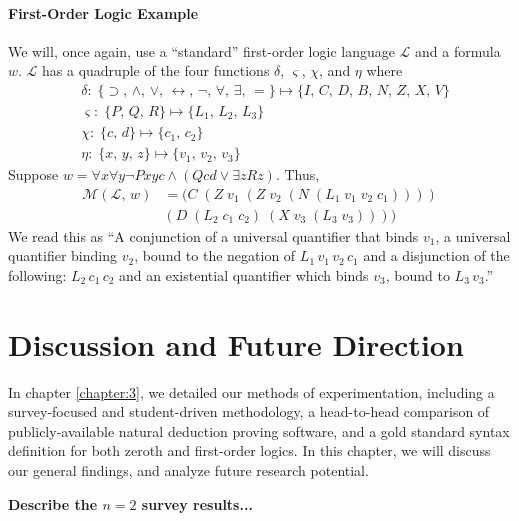 \documentclass[ms]{uncgdissertationexp2}
\theoremstyle{plain}
\theoremstyle{definition}
\theoremstyle{remark}
\begin{document}
\subsubsection{First-Order Logic Example} We will, once again, use a ``standard'' first-order logic language $\mathcal{L}$ and a formula $w$. $\mathcal{L}$ has a quadruple of the four functions $\delta$, $\varsigma$, $\chi$, and $\eta$ where
\begin{align*}
	  & \delta:\;\{\supset,\,\land,\,\lor,\,\leftrightarrow,\,\lnot,\,\forall,\,\exists,\,=\}\mapsto \{I,\,C,\,D,\,B,\,N,\,Z,\,X,\,V\} \\
	  & \varsigma:\;\{P,\,Q,\,R\} \mapsto \{L_{1},\,L_{2},\,L_{3}\}                                                                       \\
	  & \chi:\;\{c,\,d\} \mapsto \{c_1,\,c_2\}                                                                                       \\
	  & \eta:\;\{x,\,y,\,z\} \mapsto \{v_1,\,v_2,\,v_3\}                                                                             
\end{align*}
Suppose $w = \forall{x}\forall{y}\lnot{Pxyc} \land (Qcd \lor \exists{z}Rz)$. Thus,
\begin{align*}
	\mathcal{M}(\mathcal{L},\,w) & = (C\;(Z\;v_1\;(Z\;v_2\;(N\;(L_1\;v_1\;v_2\;c_1)))) \\
	                   & (D\;(L_2\;c_1\;c_2)\;(X\;v_3\;(L_3\;v_3))))         
\end{align*}
We read this as ``A conjunction of a universal quantifier that binds $v_1$, a universal quantifier binding $v_2$, bound to the negation of $L_1\,v_1\,v_2\,c_1$ and a disjunction of the following: $L_2\,c_1\,c_2$ and an existential quantifier which binds $v_3$, bound to $L_3\,v_3$.''

\chapter{Discussion and Future Direction}\label{chapter:4}
In chapter \ref{chapter:3}, we detailed our methods of experimentation, including a survey-focused and student-driven methodology, a head-to-head comparison of publicly-available natural deduction proving software, and a gold standard syntax definition for both zeroth and first-order logics. In this chapter, we will discuss our general findings, and analyze future research potential.

\textbf{Describe the $n=2$ survey results...}
\end{document}
